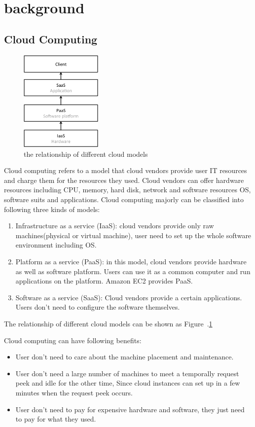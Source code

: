 \section{background}
\label{sec:background}
\subsection{Cloud Computing}
\begin{figure}
\centering
\includegraphics[width=4cm]{img/cloud_models.pdf}
\caption{the relationship of different cloud models}
\label{background:cloud models}
\end{figure}

Cloud computing refers to a model that cloud vendors provide user IT resources and charge them for
the resources they used.
Cloud vendors can offer hardware resources including CPU, memory, hard disk, network and software
resources OS, software suits and applications.
Cloud computing majorly can be classified into following three kinds of models:
\begin{enumerate}
  \item Infrastructure as a service (IaaS): cloud vendors provide only raw machines(physical or
  virtual machine), user need to set up the whole software environment including OS.
  \item Platform as a service (PaaS): in this model, cloud vendors provide hardware as well as
  software platform. Users can use it as a common computer and run applications on the platform.
  Amazon EC2 provides PaaS.
  \item Software as a service (SaaS): Cloud vendors provide a certain applications. Users don't need
  to configure the software themselves.
\end{enumerate}
The relationship of different cloud models can be shown as Figure~.\ref{background:cloud models}

Cloud computing can have following benefits:
\begin{itemize}
  \item User don't need to care about the machine placement and maintenance.
  \item User don't need a large number of machines to meet a temporally request peek and idle for
  the other time, Since cloud instances can set up in a few minutes when the request peek occurs.
  \item User don't need to pay for expensive hardware and software, they just need to pay for what
  they used.
\end{itemize}

